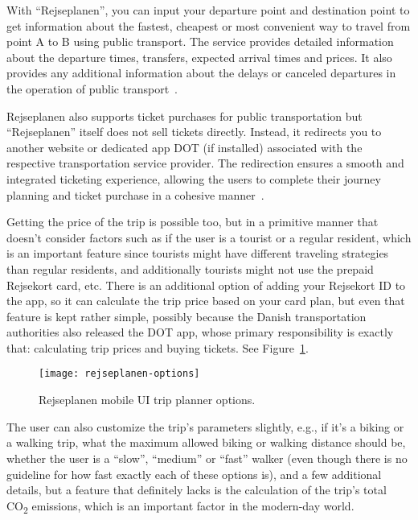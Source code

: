 With ``Rejseplanen'', you can input your departure point and destination point to get information about the fastest,
cheapest or most convenient way to travel from point A to B using public transport.
The service provides detailed information about the departure times, transfers, expected arrival times and prices.
It also provides any additional information about the delays or canceled departures in the operation of public
transport~\cite{rejseplanen2023}.

Rejseplanen also supports ticket purchases for public transportation but ``Rejseplanen'' itself does not sell tickets
directly.
Instead, it redirects you to another website or dedicated app DOT (if installed) associated with the respective
transportation service provider.
The redirection ensures a smooth and integrated ticketing experience, allowing the users to complete their journey
planning and ticket purchase in a cohesive manner~\cite{rejseplanen2023}.

Getting the price of the trip is possible too, but in a primitive manner that doesn't consider factors such as if the
user is a tourist or a regular resident, which is an important feature since tourists might have different traveling
strategies than regular residents, and additionally tourists might not use the prepaid Rejsekort card, etc.
There is an additional option of adding your Rejsekort ID to the app, so it can calculate the trip price based on your
card plan, but even that feature is kept rather simple, possibly because the Danish transportation authorities also
released the DOT app, whose primary responsibility is exactly that: calculating trip prices and buying tickets.
See Figure~\ref{fig:figure9}.

\begin{figure}
    \centering
    \texttt{[image: rejseplanen-options]}
    \caption{Rejseplanen mobile UI trip planner options.}
    \label{fig:figure9}
\end{figure}

The user can also customize the trip's parameters slightly, e.g., if it's a biking or a walking trip, what the maximum
allowed biking or walking distance should be, whether the user is a ``slow'', ``medium'' or ``fast'' walker (even though
there is no guideline for how fast exactly each of these options is), and a few additional details, but a feature that
definitely lacks is the calculation of the trip’s total \unit{CO_{2}} emissions, which is an important factor in the
modern-day world.

